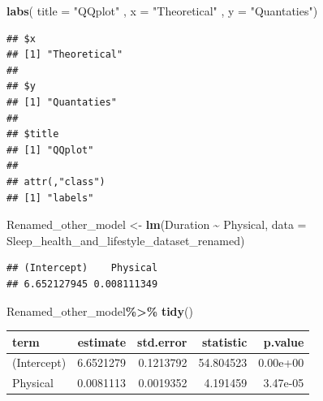\documentclass[
  11pt,
]{article}
\newenvironment{Shaded}{\begin{snugshade}}{\end{snugshade}}
\newcommand{\AttributeTok}[1]{\textcolor[rgb]{0.13,0.29,0.53}{#1}}
\newcommand{\FunctionTok}[1]{\textcolor[rgb]{0.13,0.29,0.53}{\textbf{#1}}}
\newcommand{\NormalTok}[1]{#1}
\newcommand{\OtherTok}[1]{\textcolor[rgb]{0.56,0.35,0.01}{#1}}
\newcommand{\SpecialCharTok}[1]{\textcolor[rgb]{0.81,0.36,0.00}{\textbf{#1}}}
\newcommand{\StringTok}[1]{\textcolor[rgb]{0.31,0.60,0.02}{#1}}
\begin{document}
\begin{Shaded}
\begin{Highlighting}[]
\FunctionTok{labs}\NormalTok{( }\AttributeTok{title  =} \StringTok{"QQplot"}\NormalTok{ , }\AttributeTok{x =} \StringTok{"Theoretical"}\NormalTok{ , }\AttributeTok{y =} \StringTok{"Quantaties"}\NormalTok{)}
\end{Highlighting}
\end{Shaded}

\begin{verbatim}
## $x
## [1] "Theoretical"
## 
## $y
## [1] "Quantaties"
## 
## $title
## [1] "QQplot"
## 
## attr(,"class")
## [1] "labels"
\end{verbatim}

\begin{Shaded}
\begin{Highlighting}[]
\NormalTok{Renamed\_other\_model }\OtherTok{\textless{}{-}} \FunctionTok{lm}\NormalTok{(Duration }\SpecialCharTok{\textasciitilde{}}\NormalTok{ Physical, }\AttributeTok{data =}\NormalTok{ Sleep\_health\_and\_lifestyle\_dataset\_renamed)}
\end{Highlighting}
\end{Shaded}

\begin{Shaded}
\end{Shaded}

\begin{verbatim}
## (Intercept)    Physical 
## 6.652127945 0.008111349
\end{verbatim}

\begin{Shaded}
\begin{Highlighting}[]
\NormalTok{Renamed\_other\_model}\SpecialCharTok{\%\textgreater{}\%}
  \FunctionTok{tidy}\NormalTok{()}
\end{Highlighting}
\end{Shaded}

\begin{longtable}[]{@{}lrrrr@{}}
\toprule\noalign{}
term & estimate & std.error & statistic & p.value \\
\midrule\noalign{}
\endhead
\bottomrule\noalign{}
\endlastfoot
(Intercept) & 6.6521279 & 0.1213792 & 54.804523 & 0.00e+00 \\
Physical & 0.0081113 & 0.0019352 & 4.191459 & 3.47e-05 \\
\end{longtable}
\end{document}
